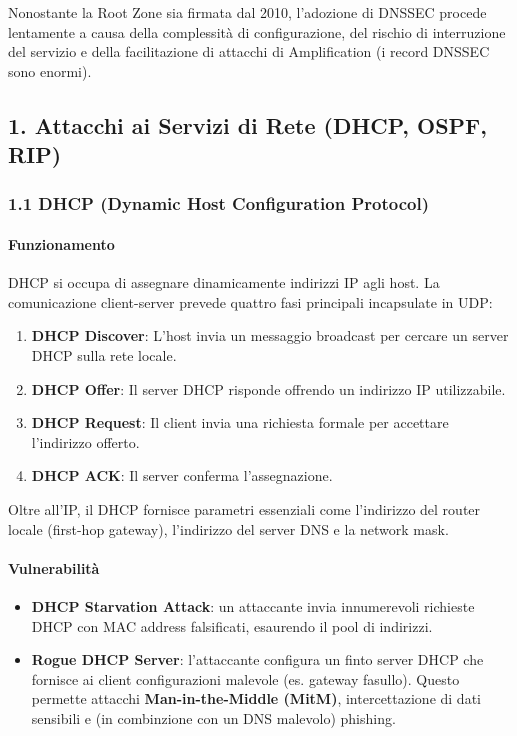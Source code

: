\documentclass{article}
\begin{document}
Nonostante la Root Zone sia firmata dal 2010, l'adozione di DNSSEC procede lentamente a causa della complessità di configurazione, del rischio di interruzione del servizio e della facilitazione di attacchi di Amplification (i record DNSSEC sono enormi).


\subsection{1. Attacchi ai Servizi di Rete (DHCP, OSPF, RIP)}

\subsubsection{1.1 DHCP (Dynamic Host Configuration Protocol)}
\paragraph{Funzionamento}
DHCP si occupa di assegnare dinamicamente indirizzi IP agli host. La comunicazione client-server prevede quattro fasi principali incapsulate in UDP:
\begin{enumerate}
    \item \textbf{DHCP Discover}: L'host invia un messaggio broadcast per cercare un server DHCP sulla rete locale.
    \item \textbf{DHCP Offer}: Il server DHCP risponde offrendo un indirizzo IP utilizzabile.
    \item \textbf{DHCP Request}: Il client invia una richiesta formale per accettare l'indirizzo offerto.
    \item \textbf{DHCP ACK}: Il server conferma l'assegnazione.
\end{enumerate}
Oltre all'IP, il DHCP fornisce parametri essenziali come l'indirizzo del router locale (first-hop gateway), l'indirizzo del server DNS e la network mask.

\paragraph{Vulnerabilità}
\begin{itemize}
    \item \textbf{DHCP Starvation Attack}: un attaccante invia innumerevoli richieste DHCP con MAC address falsificati, esaurendo il pool di indirizzi.
    \item \textbf{Rogue DHCP Server}: l'attaccante configura un finto server DHCP che fornisce ai client configurazioni malevole (es. gateway fasullo). Questo permette attacchi \textbf{Man-in-the-Middle (MitM)}, intercettazione di dati sensibili e (in combinzione con un DNS malevolo) phishing.
\end{itemize}
\end{document}
